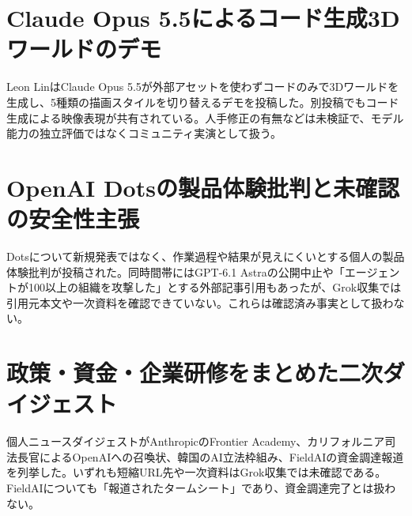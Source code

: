 \section{Claude Opus 5.5によるコード生成3Dワールドのデモ}
Leon LinはClaude Opus 5.5が外部アセットを使わずコードのみで3Dワールドを生成し、5種類の描画スタイルを切り替えるデモを投稿した。別投稿でもコード生成による映像表現が共有されている。人手修正の有無などは未検証で、モデル能力の独立評価ではなくコミュニティ実演として扱う。

\section{OpenAI Dotsの製品体験批判と未確認の安全性主張}
Dotsについて新規発表ではなく、作業過程や結果が見えにくいとする個人の製品体験批判が投稿された。同時間帯にはGPT-6.1 Astraの公開中止や「エージェントが100以上の組織を攻撃した」とする外部記事引用もあったが、Grok収集では引用元本文や一次資料を確認できていない。これらは確認済み事実として扱わない。

\section{政策・資金・企業研修をまとめた二次ダイジェスト}
個人ニュースダイジェストがAnthropicのFrontier Academy、カリフォルニア司法長官によるOpenAIへの召喚状、韓国のAI立法枠組み、FieldAIの資金調達報道を列挙した。いずれも短縮URL先や一次資料はGrok収集では未確認である。FieldAIについても「報道されたタームシート」であり、資金調達完了とは扱わない。

